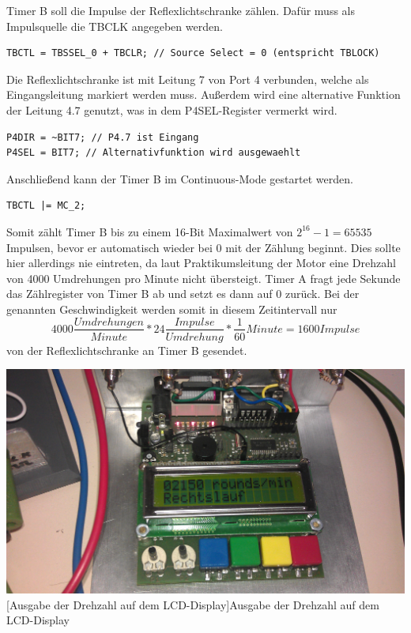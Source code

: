 \documentclass[12pt,a4paper,bibliography=totocnumbered,listof=totocnumbered]{scrartcl}
\begin{document}
\vspace{1em}



Timer B soll die Impulse der Reflexlichtschranke zählen. Dafür muss als Impulsquelle die TBCLK angegeben werden.

\vspace{1em}
\begin{lstlisting}[caption=Konfiguration Timer B]
TBCTL = TBSSEL_0 + TBCLR; // Source Select = 0 (entspricht TBLOCK)
\end{lstlisting}

Die Reflexlichtschranke ist mit Leitung 7 von Port 4 verbunden, welche als Eingangsleitung markiert werden muss. Außerdem wird eine alternative Funktion der Leitung 4.7 genutzt, was in dem P4SEL-Register vermerkt wird.

\vspace{1em}
\begin{lstlisting}[caption=Konfiguration Port 4,label=KonfPort4]
P4DIR = ~BIT7; // P4.7 ist Eingang
P4SEL = BIT7; // Alternativfunktion wird ausgewaehlt
\end{lstlisting}

Anschließend kann der Timer B im Continuous-Mode gestartet werden. 

\vspace{1em}
\begin{lstlisting}[caption=Starten von Timer B]
TBCTL |= MC_2;
\end{lstlisting}

Somit zählt Timer B bis zu einem 16-Bit Maximalwert von \(2^{16}-1=65535\) Impulsen, bevor er automatisch wieder bei 0 mit der Zählung beginnt. Dies sollte hier allerdings nie eintreten, da laut Praktikumsleitung der Motor eine Drehzahl von 4000 Umdrehungen pro Minute nicht übersteigt. Timer A fragt jede Sekunde das Zählregister von Timer B ab und setzt es dann auf 0 zurück. Bei der genannten Geschwindigkeit werden somit in diesem Zeitintervall nur
\[4000 \frac{Umdrehungen}{Minute} * 24 \frac{Impulse}{Umdrehung}*\frac{1}{60}Minute=1600Impulse\]
von der Reflexlichtschranke an Timer B gesendet.


\vspace{1em}
\begin{minipage}{\linewidth}
	\centering
	\includegraphics[width=0.7\linewidth]{img/MotorDrehzahl2.jpg}
	[Ausgabe der Drehzahl auf dem LCD-Display]{Ausgabe der Drehzahl auf dem LCD-Display}
	\label{fig:DrehzahlAusgabe}
\end{minipage}
\end{document}
